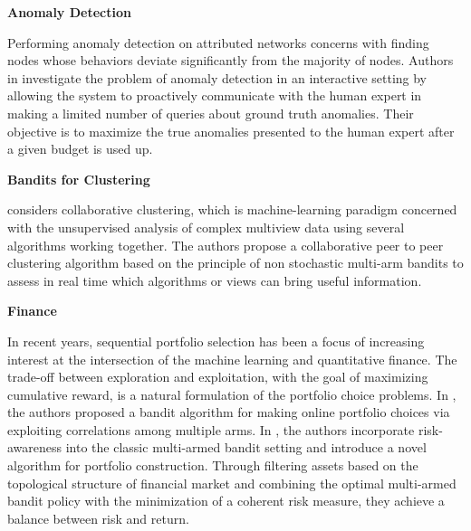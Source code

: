 \documentclass[11pt]{article}
\begin{document}
\textbf{Anomaly Detection}

Performing anomaly detection on attributed networks concerns with finding nodes whose behaviors deviate significantly from the majority of nodes. Authors in \cite{ding2019deep} investigate the problem of anomaly detection in an interactive setting by allowing the system to proactively communicate with the human expert in making a limited number of queries about ground truth anomalies. Their objective is to maximize the true anomalies presented to the human expert after a given budget is used up.

\textbf{Bandits for Clustering}

\cite{sublime2018collaborative} considers collaborative clustering, which is machine-learning paradigm concerned with the unsupervised analysis of complex multiview data using several algorithms working together. The authors propose a collaborative peer to peer clustering algorithm based on the principle of non stochastic multi-arm bandits to assess in real time which algorithms or views can bring useful information.

\textbf{Finance}

In recent years, sequential portfolio selection has been a focus of increasing interest at the intersection of the machine learning and quantitative finance. The trade-off between exploration and exploitation, with the goal of maximizing cumulative reward, is a natural formulation of the portfolio choice problems. In \cite{shen2015portfolio}, the
authors proposed a bandit algorithm for making online portfolio choices via exploiting correlations among multiple arms. In \cite{huo2017risk}, the authors incorporate risk-awareness into the classic multi-armed bandit setting and introduce a novel algorithm for portfolio construction. Through filtering assets based on the topological structure of financial market and combining the optimal multi-armed bandit policy with the minimization of a coherent risk measure, they achieve a balance between risk and return.
\end{document}
